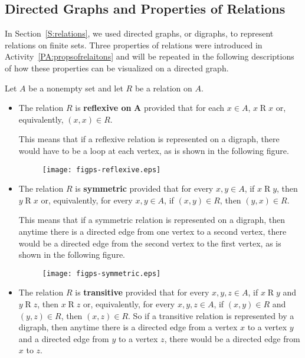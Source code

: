 \subsection*{Directed Graphs and Properties of Relations}
In Section~\ref{S:relations}, we used directed graphs, or digraphs, to represent relations on finite sets.  Three properties of relations were introduced 
in \typeu Activity~\ref*{PA:propsofrelaitons} and will be repeated in the following descriptions of how these properties can be visualized on a directed graph.  

Let $A$ be a nonempty set and let $R$ be a relation on $A$.
\begin{itemize}
\item  The relation  $R$  is 
\textbf{reflexive on}
%
%
 $\boldsymbol{A}$  provided that for each  
$x \in A$,  $x \mathrel{R} x$ or, equivalently,  $\left( {x, x} \right) \in R$.

This means that if a reflexive relation is represented on a digraph, there would have to be a loop at each vertex, as is shown in the following figure.

\begin{figure}[h]
\begin{center}
\texttt{[image: figps-reflexive.eps]}
\end{center}
\end{figure}

\item The relation  $R$  is \textbf{symmetric}
%
%
  provided that for every  $x, y \in A$,  if  
$x \mathrel{R} y$, then  $y \mathrel{R} x$ or, equivalently, for every  $x, y \in A$,  if  $\left( {x, y} \right) \in R$, then  $\left( {y, x} \right) \in R$.

This means that if a symmetric relation is represented on a digraph, then anytime there is a directed edge from one vertex to a second vertex, there would be a directed edge from the second vertex to the first vertex, as is shown in the following figure.
\begin{figure}[h]
\begin{center}
\texttt{[image: figps-symmetric.eps]}
\end{center}
\end{figure}
\item The relation  $R$  is \textbf{transitive}
%
%
  provided that for every $x, y, z \in A$,  if  $x \mathrel{R} y$ and  $y \mathrel{R} z$, then  $x \mathrel{R} z$ or, equivalently, for every  $x, y, z \in A$,  if  $\left( {x, y} \right) \in R$ and $\left( {y, z} \right) \in R$, then  $\left( {x, z} \right) \in R$.  So if a transitive relation is represented by a digraph, then anytime there is a directed edge from a vertex  $x$  to a vertex $y$ and a directed edge from  $y$  to a vertex $z$, there would be a directed edge from  $x$  to  $z$.  


\end{itemize}
